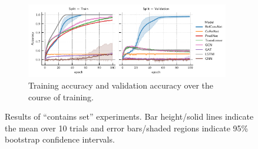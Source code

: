 \begin{figure}[ht]
    \begin{subfigure}[t]{0.97\textwidth}
        \centering
        \includegraphics[width=0.975\textwidth]{figs/experiments/contains_set_training_curves.pdf}
        \caption{Training accuracy and validation accuracy over the course of training.}\label{fig:contains_set_training_curves}
    \end{subfigure}
    \caption{Results of ``contains set'' experiments. Bar height/solid lines indicate the mean over 10 trials and error bars/shaded regions indicate 95\% bootstrap confidence intervals.}\label{fig:contains_set_experiment}
    \vskip-5pt
\end{figure}


